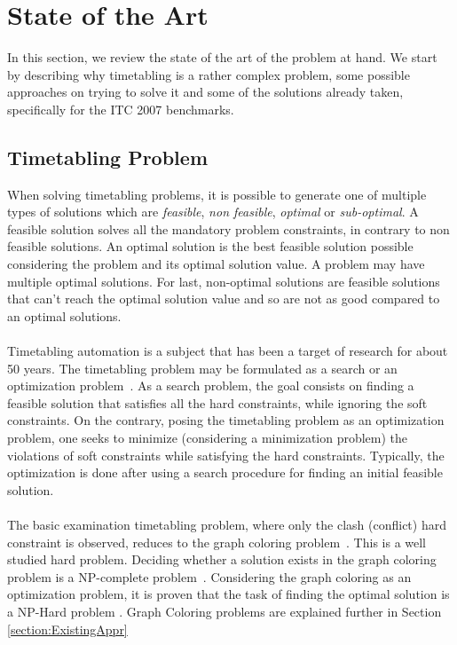 \chapter{State of the Art}
\label{stateofart}
\thispagestyle{plain}

In this section, we review the state of the art of the problem at hand. We start by describing why timetabling is a rather complex problem, some possible approaches on trying to solve it and some of the solutions already taken, specifically for the ITC 2007 benchmarks.\\

\section{Timetabling Problem}

When solving timetabling problems, it is possible to generate one of multiple types of solutions which are \textit{feasible}, \textit{non feasible}, \textit{optimal} or \textit{sub-optimal}. A feasible solution solves all the mandatory problem constraints, in contrary to non feasible solutions. An optimal solution is the best feasible solution possible considering the problem and its optimal solution value. A problem may have multiple optimal solutions. For last, non-optimal solutions are feasible solutions that can't reach the optimal solution value and so are not as good compared to an optimal solutions.\\
\\
Timetabling automation is a subject that has been a target of research for about 50 years. The timetabling problem may be formulated as a search or an optimization problem~\cite{Schaerf1999}. As a search problem, the goal consists on finding a feasible solution that satisfies all the hard constraints, while ignoring the soft constraints. On the contrary, posing the timetabling problem as an optimization problem, one seeks to minimize (considering a minimization problem) the violations of soft constraints while satisfying the hard constraints. Typically, the optimization is done after using a search procedure for finding an initial feasible solution.\\
\\
The basic examination timetabling problem, where only the clash (conflict) hard constraint is observed, reduces to the graph coloring problem~\cite{Jensen2001}. This is a well studied hard problem. Deciding whether a solution exists in the graph coloring problem is a NP-complete problem~\cite{Arora2009}. Considering the graph coloring as an optimization problem, it is proven that the task of finding the optimal solution is a NP-Hard problem \cite{Arora2009}. Graph Coloring problems are explained further in Section \ref{section:ExistingAppr}
\\
